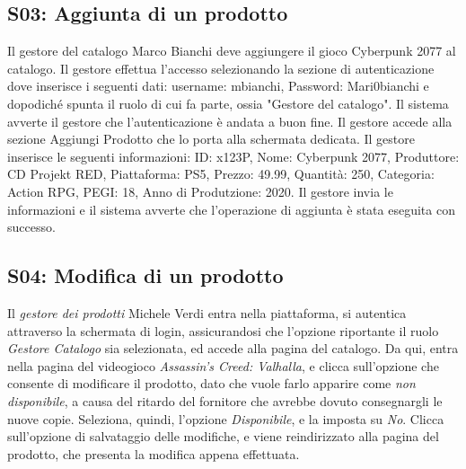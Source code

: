 \documentclass[12pt, a4paper, oneside]{book}
\begin{document}
    \subsection*{S03: Aggiunta di un prodotto}
        Il gestore del catalogo Marco Bianchi deve aggiungere il gioco Cyberpunk 2077 al catalogo. Il gestore
        effettua l'accesso selezionando la sezione di autenticazione dove inserisce i seguenti dati: username: mbianchi, Password: Mari0bianchi
        e dopodiché spunta il ruolo di cui fa parte, ossia "Gestore del catalogo".
        Il sistema avverte il gestore che l'autenticazione è andata a buon fine. Il gestore accede alla sezione
        Aggiungi Prodotto che lo porta alla schermata dedicata. Il gestore inserisce le seguenti informazioni:
        ID: x123P, Nome: Cyberpunk 2077, Produttore: CD Projekt RED, Piattaforma: PS5, Prezzo: 49.99, Quantità: 250,
        Categoria: Action RPG, PEGI: 18, Anno di Produtzione: 2020. Il gestore invia le informazioni
        e il sistema avverte che l'operazione di aggiunta è stata eseguita con successo.

    \subsection*{S04: Modifica di un prodotto}
        Il \textit{gestore dei prodotti} Michele Verdi entra nella piattaforma, si autentica attraverso la schermata di login, assicurandosi
        che l'opzione riportante il ruolo \textit{Gestore Catalogo} sia selezionata, ed accede alla pagina del catalogo. Da qui, entra
        nella pagina del videogioco \textit{Assassin's Creed: Valhalla}, e clicca sull'opzione che consente di modificare il prodotto, dato che vuole farlo apparire
        come \textit{non disponibile}, a causa del ritardo del fornitore che avrebbe dovuto consegnargli le nuove copie. Seleziona, quindi, l'opzione \textit{Disponibile},
        e la imposta su \textit{No}. Clicca sull'opzione di salvataggio delle modifiche, e viene reindirizzato alla pagina del prodotto, che presenta la modifica appena effettuata.
\end{document}
